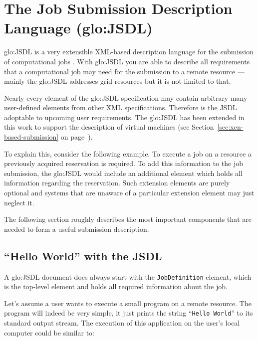 \section[The Job Submission Description Language]
{The Job Submission Description Language (\gls{glo:JSDL})}
\label{sec:fundamentals:jsdl}

\gls{glo:JSDL} is a very extensible XML-based description language for the
submission  of computational  jobs \cite{jsdl-spec}.   With \gls{glo:JSDL}
you are  able to  describe all requirements  that a computational  job may
need for the submission to a remote resource --- mainly the \gls{glo:JSDL}
addresses grid resources but it is not limited to that.

Nearly  every  element of  the  \gls{glo:JSDL}  specification may  contain
arbitrary  many  user-defined  elements  from  other  XML  specifications.
Therefore  is  the JSDL  adoptable  to  upcoming  user requirements.   The
\gls{glo:JSDL} has been  extended in this work to  support the description
of   virtual  machines   (see   Section~\ref{sec:xen-based-submission}  on
page~\pageref{sec:xen-based-submission}).

To explain  this, consider the  following example. To  execute a job  on a
resource  a previously  acquired  reservation is  required.   To add  this
information  to the job  submission, the  \gls{glo:JSDL} would  include an
additional   element   which   holds   all   information   regarding   the
reservation. Such extension elements  are purely optional and systems that
are unaware of a particular extension element may just neglect it.

The following section roughly describes the most important components that
are needed to form a useful submission description.

\subsection{``Hello World'' with the JSDL}

A    \gls{glo:JSDL}    document     does    always    start    with    the
\texttt{JobDefinition} element,  which is the top-level  element and holds
all required information about the job.

Let's assume a user wants to execute a small program on a remote resource.
The  program  will  indeed be  very  simple,  it  just prints  the  string
``\texttt{Hello World}'' to its  standard output stream.  The execution of
this application on the user's local computer could be similar to:

